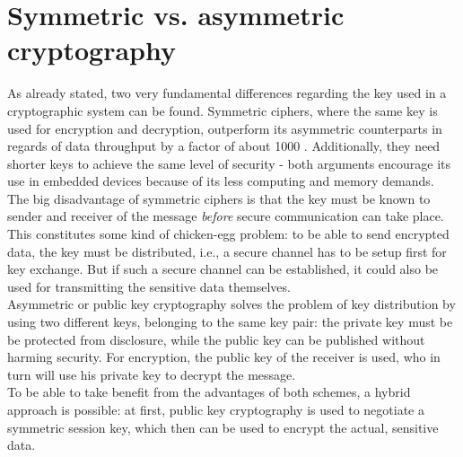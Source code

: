 \section{Symmetric vs. asymmetric cryptography}

As already stated, two very fundamental differences regarding the key used in a cryptographic system can be found. Symmetric ciphers, where 
the same key is used for encryption and decryption, outperform its asymmetric counterparts in regards of data throughput by a factor of about 1000 \cite{5412055}.
Additionally, they need shorter keys to achieve the same level of security - both arguments encourage its use in embedded devices because of its less computing
and memory demands.
\\
The big disadvantage of symmetric ciphers is that the key must be known to sender
and receiver of the message \textit{before} secure communication can take place. This constitutes some kind of chicken-egg problem: to be able to send encrypted
data, the key must be distributed, i.e., a secure channel has to be setup first for key exchange. But if such a secure channel can be established, it could also be used
for transmitting the sensitive data themselves.
\\
Asymmetric or public key cryptography solves the problem of key distribution by using two different keys, belonging to the same key pair: the private
key must be be protected from disclosure, while the public key can be published without harming security. For encryption, the public key of the receiver
is used, who in turn will use his private key to decrypt the message. 
\\
To be able to take benefit from the advantages of both schemes, a hybrid approach is possible: at first, public key cryptography is used to negotiate a symmetric session
key, which then can be used to encrypt the actual, sensitive data.

